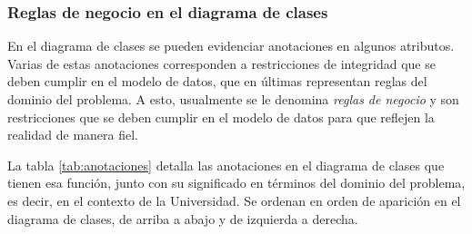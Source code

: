 \subsubsection{Reglas de negocio en el diagrama de clases}

En el diagrama de clases se pueden evidenciar anotaciones en algunos atributos. Varias de estas anotaciones corresponden a restricciones de integridad que se deben cumplir en el modelo de datos, que en últimas representan reglas del dominio del problema. A esto, usualmente se le denomina \textit{reglas de negocio} y son restricciones que se deben cumplir en el modelo de datos para que reflejen la realidad de manera fiel.

La tabla \ref{tab:anotaciones} detalla las anotaciones en el diagrama de clases que tienen esa función, junto con su significado en términos del dominio del problema, es decir, en el contexto de la Universidad. Se ordenan en orden de aparición en el diagrama de clases, de arriba a abajo y de izquierda a derecha.


